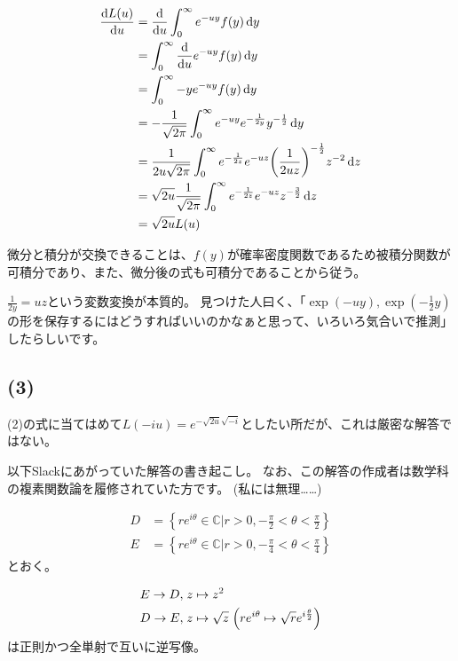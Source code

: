 \documentclass[a4paper, 10pt, dvipdfmx]{jlreq}
\begin{document}
\begin{align*}
  \dv{L(u)}{u} & =\dv{u} \int_0^{\infty} {e^{-uy}f(y)}\dd{y}                                                                        \\
               & =\int_0^{\infty} \dv{u} e^{-uy}f(y) \dd{y}                                                                         \\
               & =\int_0^{\infty}  {-y e^{-uy}f(y)} \dd{y}                                                                          \\
               & =-\frac{1}{\sqrt{2\pi}}\int_0^{\infty}  {e^{-uy}e^{-\frac{1}{2y}}y^{-\frac{1}{2}}} \dd{y}                          \\
               & =\frac{1}{2u\sqrt{2\pi}} \int_0^{\infty} {e^{-\frac{1}{2z}}e^{-uz}\qty(\frac{1}{2uz})^{-\frac{1}{2}}z^{-2}} \dd{z} \\
               & =\sqrt{2u}\frac{1}{\sqrt{2\pi}}\int_0^\infty e^{-\frac{1}{2z}}e^{-uz}z^{-\frac{3}{2}} \dd{z}                       \\
               & =\sqrt{2u}L(u)
\end{align*}

微分と積分が交換できることは、$f(y)$が確率密度関数であるため被積分関数が可積分であり、また、微分後の式も可積分であることから従う。

$\frac{1}{2y}=uz$という変数変換が本質的。
見つけた人曰く、「$\exp(-uy),\exp(-\frac{1}{2}y)$の形を保存するにはどうすればいいのかなぁと思って、いろいろ気合いで推測」したらしいです。

\subsection*{(3)}

(2)の式に当てはめて$L(-iu)=e^{-\sqrt{2u}\sqrt{-i}}$としたい所だが、これは厳密な解答ではない。

以下Slackにあがっていた解答の書き起こし。
なお、この解答の作成者は数学科の複素関数論を履修されていた方です。
(私には無理……)

\begin{align*}
  D & =\left\{ re^{i\theta}\in \mathbb{C} | r>0, -\frac{\pi}{2} < \theta < \frac{\pi}{2} \right\} \\
  E & =\left\{ re^{i\theta}\in \mathbb{C} | r>0, -\frac{\pi}{4} < \theta < \frac{\pi}{4} \right\}
\end{align*}
とおく。

\begin{align*}
  E \to D, \; & z \mapsto z^2                                                                  \\
  D \to E, \; & z \mapsto \sqrt{z} \; \qty(re^{i\theta} \mapsto \sqrt{r}e^{i\frac{\theta}{2}})
\end{align*}
は正則かつ全単射で互いに逆写像。
\end{document}
